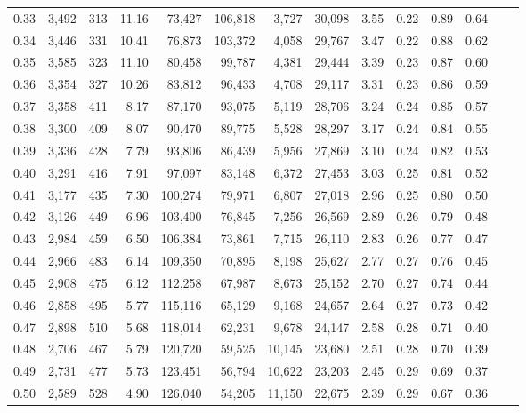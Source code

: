 \begin{tabular}{rrrrrrrrrrrrrr}
0.33 &  3,492 &  313 &   11.16 &   73,427 &  106,818 &   3,727 &  30,098 &  3.55 &  0.22 &  0.89 &      0.64 \\
0.34 &  3,446 &  331 &   10.41 &   76,873 &  103,372 &   4,058 &  29,767 &  3.47 &  0.22 &  0.88 &      0.62 \\
0.35 &  3,585 &  323 &   11.10 &   80,458 &   99,787 &   4,381 &  29,444 &  3.39 &  0.23 &  0.87 &      0.60 \\
0.36 &  3,354 &  327 &   10.26 &   83,812 &   96,433 &   4,708 &  29,117 &  3.31 &  0.23 &  0.86 &      0.59 \\
0.37 &  3,358 &  411 &    8.17 &   87,170 &   93,075 &   5,119 &  28,706 &  3.24 &  0.24 &  0.85 &      0.57 \\
0.38 &  3,300 &  409 &    8.07 &   90,470 &   89,775 &   5,528 &  28,297 &  3.17 &  0.24 &  0.84 &      0.55 \\
0.39 &  3,336 &  428 &    7.79 &   93,806 &   86,439 &   5,956 &  27,869 &  3.10 &  0.24 &  0.82 &      0.53 \\
0.40 &  3,291 &  416 &    7.91 &   97,097 &   83,148 &   6,372 &  27,453 &  3.03 &  0.25 &  0.81 &      0.52 \\
0.41 &  3,177 &  435 &    7.30 &  100,274 &   79,971 &   6,807 &  27,018 &  2.96 &  0.25 &  0.80 &      0.50 \\
0.42 &  3,126 &  449 &    6.96 &  103,400 &   76,845 &   7,256 &  26,569 &  2.89 &  0.26 &  0.79 &      0.48 \\
0.43 &  2,984 &  459 &    6.50 &  106,384 &   73,861 &   7,715 &  26,110 &  2.83 &  0.26 &  0.77 &      0.47 \\
0.44 &  2,966 &  483 &    6.14 &  109,350 &   70,895 &   8,198 &  25,627 &  2.77 &  0.27 &  0.76 &      0.45 \\
0.45 &  2,908 &  475 &    6.12 &  112,258 &   67,987 &   8,673 &  25,152 &  2.70 &  0.27 &  0.74 &      0.44 \\
0.46 &  2,858 &  495 &    5.77 &  115,116 &   65,129 &   9,168 &  24,657 &  2.64 &  0.27 &  0.73 &      0.42 \\
0.47 &  2,898 &  510 &    5.68 &  118,014 &   62,231 &   9,678 &  24,147 &  2.58 &  0.28 &  0.71 &      0.40 \\
0.48 &  2,706 &  467 &    5.79 &  120,720 &   59,525 &  10,145 &  23,680 &  2.51 &  0.28 &  0.70 &      0.39 \\
0.49 &  2,731 &  477 &    5.73 &  123,451 &   56,794 &  10,622 &  23,203 &  2.45 &  0.29 &  0.69 &      0.37 \\
0.50 &  2,589 &  528 &    4.90 &  126,040 &   54,205 &  11,150 &  22,675 &  2.39 &  0.29 &  0.67 &      0.36 \\

\end{tabular}
